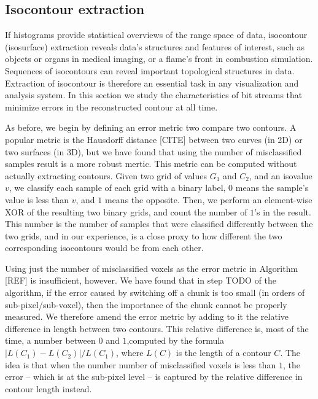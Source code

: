 
\subsection{Isocontour extraction}
\label{sec:isocontour}
If histograms provide statistical overviews of the range space of data, isocontour (isosurface)
extraction reveals data's structures and features of interest, such as objects or organs in medical
imaging, or a flame's front in combustion simulation. Sequences of isocontours can reveal important
topological structures in data. Extraction of isocontour is therefore an essential task in any
visualization and analysis system. In this section we study the characteristics of bit streams that
minimize errors in the reconstructed contour at all time.

As before, we begin by defining an error metric two compare two contours. A popular metric is the
Hausdorff distance [CITE] between two curves (in 2D) or two surfaces (in 3D), but we have found that
using the number of misclassified samples result is a more robust mertic. This metric can be
computed without actually extracting contours. Given two grid of values $G_1$ and $C_2$, and an
isovalue $v$, we classify each sample of each grid with a binary label, $0$ means the sample's value
is less than $v$, and $1$ means the opposite. Then, we perform an element-wise XOR of the resulting
two binary grids, and count the number of $1$'s in the result. This number is the number of samples
that were classified differently between the two grids, and in our experience, is a close proxy to
how different the two corresponding isocontours would be from each other.

Using just the number of misclassified voxels as the error metric in Algorithm [REF] is
insufficient, however. We have found that in step TODO of the algorithm, if the error caused by
switching off a chunk is too small (in orders of sub-pixel/sub-voxel), then the importance of the
chunk cannot be properly measured. We therefore amend the error metric by adding to it the relative
difference in length between two contours. This relative difference is, most of the time, a number
between $0$ and $1$,computed by the formula $|L(C_1)-L(C_2)|/L(C_1)$, where $L(C)$ is the length of
a contour $C$. The idea is that when the number number of misclassified voxels is less than $1$, the
error -- which is at the sub-pixel level -- is captured by the relative difference in contour length
instead.

